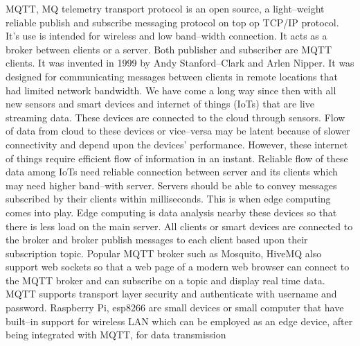 \documentclass[sigconf]{acmart}
\begin{document}
MQTT, MQ telemetry transport protocol is an open source, a light--weight  reliable publish and subscribe messaging protocol on top op TCP/IP protocol. It's  use is intended for wireless and low band--width connection. It acts as a broker between clients or a server. Both publisher and subscriber are MQTT clients. It was invented in 1999 by Andy Stanford--Clark and Arlen Nipper. It was designed for communicating messages between clients in remote locations that had limited network bandwidth. We have come a long way since then  with all new sensors and smart devices and internet of things (IoTs) that are live streaming  data. These devices are connected to the cloud through sensors. Flow of data from cloud to these devices or vice--versa may be latent because of slower connectivity and depend upon the devices' performance. However, these internet of things require efficient flow of information in an instant. Reliable flow of these data among IoTs need reliable connection between server and its clients which may need higher band--with server. Servers should be able to convey messages subscribed by their clients within milliseconds. This is when edge computing comes into play. Edge computing is data analysis nearby these devices so that there is less load on the main server.  All clients or smart devices are connected to the broker and broker publish messages to each client based upon their subscription topic. Popular MQTT broker such as Mosquito, HiveMQ also support web sockets so that a web page of a modern web browser can connect to the MQTT broker and can subscribe on a topic and display real time data. MQTT supports transport layer security and authenticate with username  and password. Raspberry Pi, esp8266 are small devices or small computer that have built--in support for wireless LAN which can be employed as an edge device, after being integrated with MQTT,  for data transmission 
\end{document}
